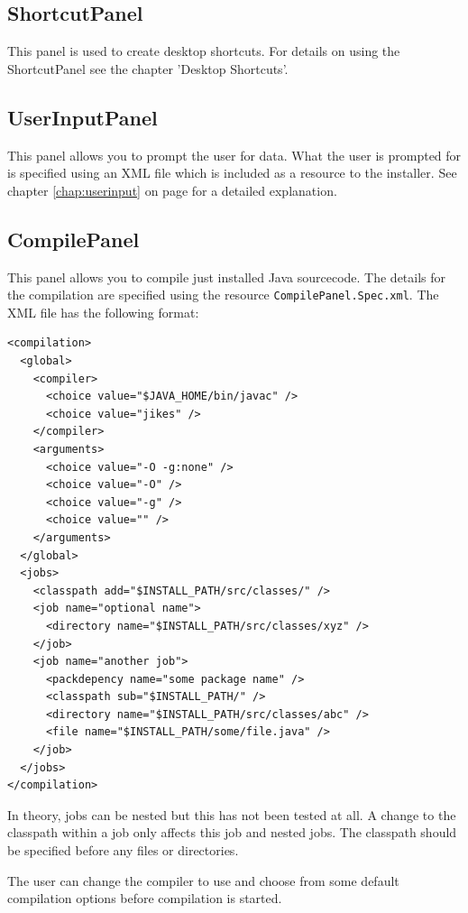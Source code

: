 \subsection{ShortcutPanel}

This panel is used to create desktop shortcuts. For details on using the
ShortcutPanel see the chapter 'Desktop Shortcuts'.

\subsection{UserInputPanel}

This panel allows you to prompt the user for data. What the user is prompted
for is specified using an XML file which is included as a resource to the
installer. See chapter \ref{chap:userinput} on page \pageref{chap:userinput}
for a detailed explanation.

\subsection{CompilePanel}

This panel allows you to compile just installed Java sourcecode. 
The details for the compilation are specified using the resource \texttt{CompilePanel.Spec.xml}.
The XML file has the following format:
\begin{verbatim}
<compilation>
  <global>
    <compiler>
      <choice value="$JAVA_HOME/bin/javac" />
      <choice value="jikes" />
    </compiler>
    <arguments>
      <choice value="-O -g:none" />
      <choice value="-O" />
      <choice value="-g" />
      <choice value="" />
    </arguments>
  </global>
  <jobs>
    <classpath add="$INSTALL_PATH/src/classes/" />
    <job name="optional name">
      <directory name="$INSTALL_PATH/src/classes/xyz" />
    </job>
    <job name="another job">
      <packdepency name="some package name" />
      <classpath sub="$INSTALL_PATH/" />
      <directory name="$INSTALL_PATH/src/classes/abc" />
      <file name="$INSTALL_PATH/some/file.java" />
    </job>
  </jobs>
</compilation>
\end{verbatim}

In theory, jobs can be nested but this has not been tested at all. A change to
the classpath within a job only affects this job and nested jobs. The classpath
should be specified before any files or directories.

The user can change the compiler to use and choose from some default
compilation options before compilation is started. 


